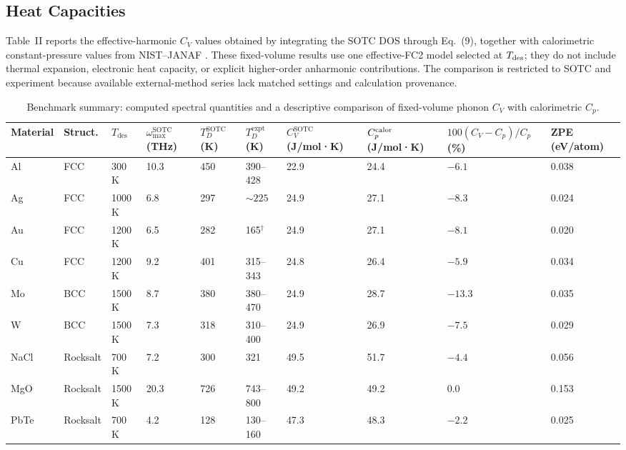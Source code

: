 \documentclass[aps,prb,reprint,amsmath,amssymb,floatfix]{revtex4-2}
\begin{document}
\subsection{Heat Capacities}\label{heat-capacities}

\color{revisionblue}
Table~II reports the effective-harmonic \(C_V\) values obtained by integrating
the SOTC DOS through Eq.~(9), together with calorimetric constant-pressure values from NIST--JANAF \cite{ref20}.
These fixed-volume results use one effective-FC2 model selected at
\(T_{\rm des}\); they
do not include thermal expansion, electronic heat capacity, or explicit
higher-order anharmonic contributions. The comparison is restricted to SOTC
and experiment because available external-method series lack matched settings
and calculation provenance.
\color{black}

\color{revisionblue}
\begin{table}[htbp]
\tiny
\caption{Benchmark summary: computed spectral quantities and a descriptive comparison of fixed-volume phonon $C_V$ with calorimetric $C_p$.}
\begin{ruledtabular}
\begin{tabular}{llllllllll}Material & Struct. & \(T_\text{des}\) & \(\omega_\text{max}^\text{SOTC}\) (THz) & \(T_D^\text{SOTC}\) (K) & \(T_D^\text{expt}\) (K) & \(C_V^\text{SOTC}\) (J/mol·K) & \(C_p^{\rm calor}\) (J/mol·K) & \(100(C_V-C_p)/C_p\) (\%) & ZPE (eV/atom) \\
\hline
Al & FCC & 300 K & 10.3 & 450 & 390--428 \cite{ref22} & 22.9 &
24.4 & $-6.1$ & 0.038 \\
Ag & FCC & 1000 K & 6.8 & 297 & \(\sim\!225\) \cite{ref25} & 24.9 & 27.1
& $-8.3$ & 0.024 \\
Au & FCC & 1200 K & 6.5 & 282 & 165\(^\dagger\) \cite{ref23} & 24.9 &
27.1 & $-8.1$ & 0.020 \\
Cu & FCC & 1200 K & 9.2 & 401 & 315--343 \cite{ref24,ref33} & 24.8 & 26.4 &
$-5.9$ & 0.034 \\
Mo & BCC & 1500 K & 8.7 & 380 & 380--470 \cite{ref26} & 24.9 &
28.7 & $-13.3$ & 0.035 \\
W & BCC & 1500 K & 7.3 & 318 & 310--400 \cite{ref27} & 24.9 & 26.9 & $-7.5$
& 0.029 \\
NaCl & Rocksalt & 700 K & 7.2 & 300 & 321 \cite{ref28} & 49.5 & 51.7 &
$-4.4$ & 0.056 \\
MgO & Rocksalt & 1500 K & 20.3 & 726 & 743--800 \cite{ref29,ref30} &
49.2 & 49.2 & 0.0 & 0.153 \\
PbTe & Rocksalt & 700 K & 4.2 & 128 & 130--160 \cite{ref31,ref32} & 47.3
& 48.3 & $-2.2$ & 0.025 \\
\end{tabular}
\end{ruledtabular}
\label{tab:2}
\end{table}
\color{black}
\end{document}
